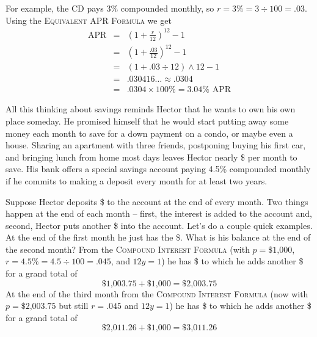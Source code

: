  \bigskip
\bigskip

For example, the CD pays 3\% compounded monthly, so $r=3\% = 3 \div 100 = .03$.  Using the \textsc{Equivalent APR Formula} we get
\begin{eqnarray*}
\text{APR}  &= & \left(1+\frac{r}{12}\right)^{12}-1\\
& = &   \left(1+\frac{.03}{12}\right)^{12}-1\\
& =  & ( 1 + .03 \div 12 ) \wedge 12 -1  \\
& =  & .030416\ldots  \approx .0304 \\
& = & .0304 \times 100\% = 3.04\% \text{ APR}
\end{eqnarray*}

All this thinking about savings reminds Hector that he wants to own his own place someday.  He promised himself that he would start putting away some money each month to save for a down payment on a condo, or maybe even a house.  Sharing an apartment with three friends, postponing buying his first car, and bringing lunch from home most days leaves Hector nearly \$ per month to save.  His bank offers a special savings account paying 4.5\% compounded monthly if he commits to making a deposit every month for at least two years.

Suppose Hector deposits \$ to the account at the end of every month.  Two things happen at the end of each month -- first, the interest is added to the account and, second, Hector puts another \$ into the account. Let's do a couple quick examples.  At the end of the first month he just has the \$.  What is his balance at the end of the second month? From the \textsc{Compound Interest Formula} (with $p=\$\text{1,000}$, $r=4.5\% = 4.5 \div 100 = .045$, and $12y=1$) he has \$ to which he adds another \$ for a grand total of 
$$ \$\text{1,003.75}+  \$\text{1,000}= \$\text{2,003.75}$$
At the end of the third month from the \textsc{Compound Interest Formula} (now with $p=\$\text{2,003.75}$ but still $r=.045$ and $12y=1$) he has \$ to which he adds another \$ for a grand total of 
$$\$\text{2,011.26} + \$\text{1,000} = \$\text{3,011.26}$$

